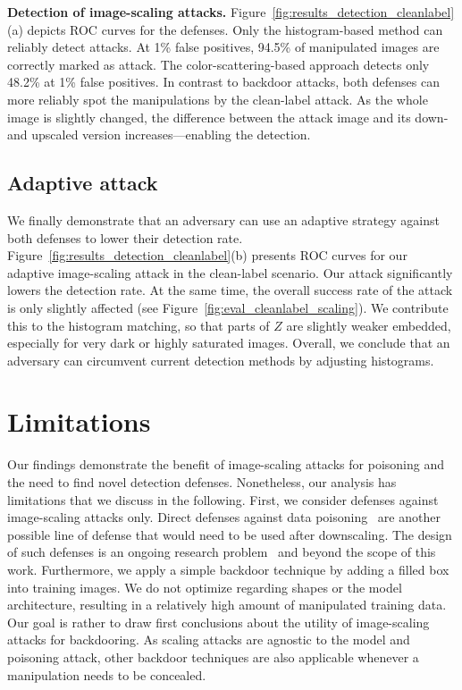 \documentclass[conference]{IEEEtran}
\renewcommand{\paragraph}[1]{{\vskip 8pt \noindent\bf #1 }}
\newcommand{\ti}{\ensuremath{Z}\xspace}
\begin{document}
\paragraph{Detection of image-scaling attacks.}
Figure~\ref{fig:results_detection_cleanlabel}(a) depicts ROC curves for
the defenses. Only the histogram-based method
can reliably detect attacks. At 1\% false positives, 94.5\% of 
manipulated images are correctly marked as attack. The 
color-scattering-based approach detects only 48.2\% at 1\% false 
positives.
In contrast to backdoor attacks, both defenses can more reliably spot 
the manipulations by the clean-label attack. As the whole image is 
slightly changed, the difference between the attack image and its down- 
and upscaled version increases---enabling the detection. 


\subsection{Adaptive attack}
We finally demonstrate that an adversary can use an adaptive strategy 
against both defenses to lower their detection rate.
Figure~\ref{fig:results_detection_cleanlabel}(b) presents ROC curves 
for our adaptive image-scaling attack in the clean-label scenario. Our 
attack significantly lowers the detection rate. At the same time, the 
overall success rate of the attack is only slightly affected (see 
Figure~\ref{fig:eval_cleanlabel_scaling}). We contribute this to the 
histogram matching, so that parts of $\ti$ are slightly weaker 
embedded, especially for very dark or {highly\EndAccSupp{}} saturated images.
Overall, we conclude that an adversary can 
circumvent current detection methods by adjusting histograms. 

\section{Limitations}\label{sec:limitations}
Our findings demonstrate the benefit of image-scaling attacks 
for poisoning and the need to find novel detection defenses. 
Nonetheless, our analysis has limitations that we discuss in the 
following.
First, we consider defenses against image-scaling attacks only. Direct 
defenses against data poisoning~\citep[e.g.][]{WanYaoShaLi+19} are 
another possible {line\EndAccSupp{}} of defense that would need to be used after 
downscaling. The design of such defenses is an ongoing 
research problem~\citep{WanYaoShaLi+19,TanSho19} and beyond the {scope\EndAccSupp{}} 
of this work.
Furthermore, we apply a simple backdoor technique by adding a filled 
box into training images. We do not optimize regarding shapes or the 
model architecture, resulting in a relatively high amount of 
manipulated training data. Our goal is rather to draw first conclusions 
about the utility of image-scaling attacks for backdooring. As 
scaling attacks are agnostic to the model and poisoning attack, other 
backdoor techniques are also applicable whenever a manipulation needs 
to be concealed.
\end{document}
